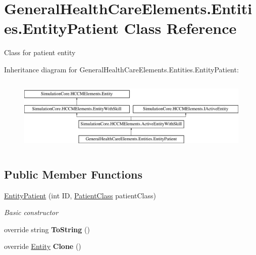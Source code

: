 \hypertarget{class_general_health_care_elements_1_1_entities_1_1_entity_patient}{}\section{General\+Health\+Care\+Elements.\+Entities.\+Entity\+Patient Class Reference}
\label{class_general_health_care_elements_1_1_entities_1_1_entity_patient}


Class for patient entity  


Inheritance diagram for General\+Health\+Care\+Elements.\+Entities.\+Entity\+Patient\+:\begin{figure}[H]
\begin{center}
\leavevmode
\includegraphics[height=3.555556cm]{class_general_health_care_elements_1_1_entities_1_1_entity_patient}
\end{center}
\end{figure}
\subsection*{Public Member Functions}
\begin{DoxyCompactItemize}
\item 
\hyperlink{class_general_health_care_elements_1_1_entities_1_1_entity_patient_aa2c08158d946d1c621529f255c412f49}{Entity\+Patient} (int ID, \hyperlink{class_general_health_care_elements_1_1_patient_class}{Patient\+Class} patient\+Class)
\begin{DoxyCompactList}\small\item\em Basic constructor \end{DoxyCompactList}\item 
override string {\bfseries To\+String} ()\hypertarget{class_general_health_care_elements_1_1_entities_1_1_entity_patient_ab24200c5654da14f93dde8a300a4263f}{}\label{class_general_health_care_elements_1_1_entities_1_1_entity_patient_ab24200c5654da14f93dde8a300a4263f}

\item 
override \hyperlink{class_simulation_core_1_1_h_c_c_m_elements_1_1_entity}{Entity} {\bfseries Clone} ()\hypertarget{class_general_health_care_elements_1_1_entities_1_1_entity_patient_ab6c67ac7c0bf0d525d539c6d4e2bd74c}{}\label{class_general_health_care_elements_1_1_entities_1_1_entity_patient_ab6c67ac7c0bf0d525d539c6d4e2bd74c}

\end{DoxyCompactItemize}
